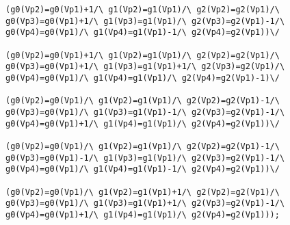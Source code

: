 \begin{appendices}
\begin{lstlisting}
(g0(Vp2)=g0(Vp1)+1/\ g1(Vp2)=g1(Vp1)/\ g2(Vp2)=g2(Vp1)/\ g0(Vp3)=g0(Vp1)+1/\ g1(Vp3)=g1(Vp1)/\ g2(Vp3)=g2(Vp1)-1/\ g0(Vp4)=g0(Vp1)/\ g1(Vp4)=g1(Vp1)-1/\ g2(Vp4)=g2(Vp1))\/ 

(g0(Vp2)=g0(Vp1)+1/\ g1(Vp2)=g1(Vp1)/\ g2(Vp2)=g2(Vp1)/\ g0(Vp3)=g0(Vp1)+1/\ g1(Vp3)=g1(Vp1)+1/\ g2(Vp3)=g2(Vp1)/\ g0(Vp4)=g0(Vp1)/\ g1(Vp4)=g1(Vp1)/\ g2(Vp4)=g2(Vp1)-1)\/ 

(g0(Vp2)=g0(Vp1)/\ g1(Vp2)=g1(Vp1)/\ g2(Vp2)=g2(Vp1)-1/\ g0(Vp3)=g0(Vp1)/\ g1(Vp3)=g1(Vp1)-1/\ g2(Vp3)=g2(Vp1)-1/\ g0(Vp4)=g0(Vp1)+1/\ g1(Vp4)=g1(Vp1)/\ g2(Vp4)=g2(Vp1))\/ 

(g0(Vp2)=g0(Vp1)/\ g1(Vp2)=g1(Vp1)/\ g2(Vp2)=g2(Vp1)-1/\ g0(Vp3)=g0(Vp1)-1/\ g1(Vp3)=g1(Vp1)/\ g2(Vp3)=g2(Vp1)-1/\ g0(Vp4)=g0(Vp1)/\ g1(Vp4)=g1(Vp1)-1/\ g2(Vp4)=g2(Vp1))\/ 

(g0(Vp2)=g0(Vp1)/\ g1(Vp2)=g1(Vp1)+1/\ g2(Vp2)=g2(Vp1)/\ g0(Vp3)=g0(Vp1)/\ g1(Vp3)=g1(Vp1)+1/\ g2(Vp3)=g2(Vp1)-1/\ g0(Vp4)=g0(Vp1)+1/\ g1(Vp4)=g1(Vp1)/\ g2(Vp4)=g2(Vp1)));
\end{lstlisting}
\end{appendices}